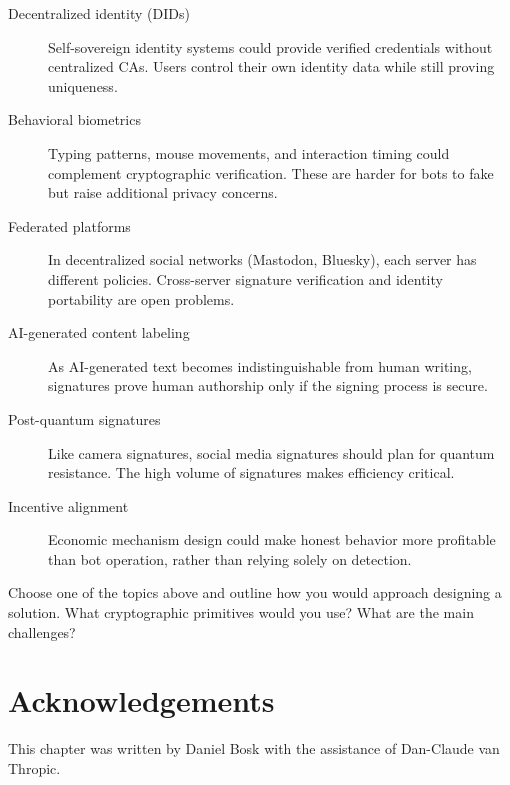 \begin{description}
  \item[Decentralized identity (DIDs)] Self-sovereign identity systems could 
    provide verified credentials without centralized CAs.
    Users control their own identity data while still proving uniqueness.
  \item[Behavioral biometrics] Typing patterns, mouse movements, and 
    interaction timing could complement cryptographic verification.
    These are harder for bots to fake but raise additional privacy concerns.
  \item[Federated platforms] In decentralized social networks (Mastodon, 
    Bluesky), each server has different policies.
    Cross-server signature verification and identity portability are open 
    problems.
  \item[AI-generated content labeling] As AI-generated text becomes 
    indistinguishable from human writing, signatures prove human authorship 
    only if the signing process is secure.
  \item[Post-quantum signatures] Like camera signatures, social media 
    signatures should plan for quantum resistance.
    The high volume of signatures makes efficiency critical.
  \item[Incentive alignment] Economic mechanism design could make honest 
    behavior more profitable than bot operation, rather than relying solely 
    on detection.
\end{description}

\begin{exercise}
  Choose one of the topics above and outline how you would approach designing a 
  solution.
  What cryptographic primitives would you use?
  What are the main challenges?
\end{exercise}


\section*{Acknowledgements}

This chapter was written by Daniel Bosk with the assistance of Dan-Claude van 
Thropic.